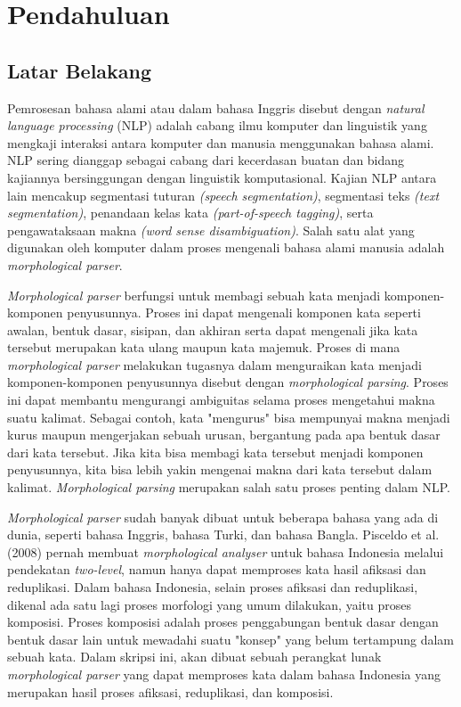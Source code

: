 \chapter{Pendahuluan}
\label{chap:pendahuluan}

\section{Latar Belakang}
\label{sec:latarBelakang}

Pemrosesan bahasa alami atau dalam bahasa Inggris disebut dengan {\it natural language processing} (NLP) adalah cabang ilmu komputer dan linguistik yang mengkaji interaksi antara komputer dan manusia menggunakan bahasa alami. NLP sering dianggap sebagai cabang dari kecerdasan buatan dan bidang kajiannya bersinggungan dengan linguistik komputasional. Kajian NLP antara lain mencakup segmentasi tuturan {\it (speech segmentation)}, segmentasi teks {\it (text segmentation)}, penandaan kelas kata {\it (part-of-speech tagging)}, serta pengawataksaan makna {\it (word sense disambiguation)}. Salah satu alat yang digunakan oleh komputer dalam proses mengenali bahasa alami manusia adalah {\it morphological parser}.

{\it Morphological parser} berfungsi untuk membagi sebuah kata menjadi komponen-komponen penyusunnya. Proses ini dapat mengenali komponen kata seperti awalan, bentuk dasar, sisipan, dan akhiran serta dapat mengenali jika kata tersebut merupakan kata ulang maupun kata majemuk. Proses di mana {\it morphological parser} melakukan tugasnya dalam menguraikan kata menjadi komponen-komponen penyusunnya disebut dengan {\it morphological parsing}. Proses ini dapat membantu mengurangi ambiguitas selama proses mengetahui makna suatu kalimat. Sebagai contoh, kata "mengurus" bisa mempunyai makna menjadi kurus maupun mengerjakan sebuah urusan, bergantung pada apa bentuk dasar dari kata tersebut. Jika kita bisa membagi kata tersebut menjadi komponen penyusunnya, kita bisa lebih yakin mengenai makna dari kata tersebut dalam kalimat. {\it Morphological parsing} merupakan salah satu proses penting dalam NLP.

{\it Morphological parser} sudah banyak dibuat untuk beberapa bahasa yang ada di dunia, seperti bahasa Inggris, bahasa Turki, dan bahasa Bangla. Pisceldo et al. (2008) pernah membuat \textit{morphological analyser} untuk bahasa Indonesia melalui pendekatan \textit{two-level}, namun hanya dapat memproses kata hasil afiksasi dan reduplikasi. Dalam bahasa Indonesia, selain proses afiksasi dan reduplikasi, dikenal ada satu lagi proses morfologi yang umum dilakukan, yaitu proses komposisi. Proses komposisi adalah proses penggabungan bentuk dasar dengan bentuk dasar lain untuk mewadahi suatu "konsep" yang belum tertampung dalam sebuah kata\cite{chaer:08:morfologi}. Dalam skripsi ini, akan dibuat sebuah perangkat lunak {\it morphological parser} yang dapat memproses kata dalam bahasa Indonesia yang merupakan hasil proses afiksasi, reduplikasi, dan komposisi.


